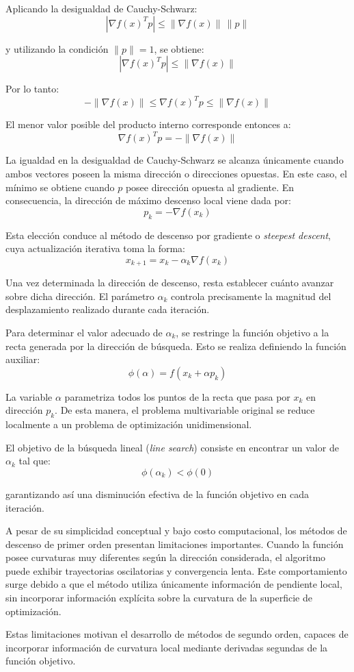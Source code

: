 Aplicando la desigualdad de Cauchy-Schwarz:
\[
|\nabla f(x)^Tp|
\leq
\|\nabla f(x)\|\,\|p\|
\]

y utilizando la condición \(\|p\|=1\), se obtiene:
\[
|\nabla f(x)^Tp|
\leq
\|\nabla f(x)\|
\]

Por lo tanto:
\[
-\|\nabla f(x)\|
\leq
\nabla f(x)^Tp
\leq
\|\nabla f(x)\|
\]

El menor valor posible del producto interno corresponde entonces a:
\[
\nabla f(x)^Tp=
-\|\nabla f(x)\|
\]

La igualdad en la desigualdad de Cauchy-Schwarz se alcanza únicamente cuando ambos vectores poseen la misma dirección o direcciones opuestas. En este caso, el mínimo se obtiene cuando \(p\) posee dirección opuesta al gradiente. En consecuencia, la dirección de máximo descenso local viene dada por:
\[
p_k=-\nabla f(x_k)
\]

Esta elección conduce al método de descenso por gradiente o \textit{steepest descent}, cuya actualización iterativa toma la forma:
\[
x_{k+1}=x_k-\alpha_k\nabla f(x_k)
\]

Una vez determinada la dirección de descenso, resta establecer cuánto avanzar sobre dicha dirección. El parámetro \(\alpha_k\) controla precisamente la magnitud del desplazamiento realizado durante cada iteración.

Para determinar el valor adecuado de \(\alpha_k\), se restringe la función objetivo a la recta generada por la dirección de búsqueda. Esto se realiza definiendo la función auxiliar:
\[
\phi(\alpha)=f(x_k+\alpha p_k)
\]

La variable \(\alpha\) parametriza todos los puntos de la recta que pasa por \(x_k\) en dirección \(p_k\). De esta manera, el problema multivariable original se reduce localmente a un problema de optimización unidimensional.

El objetivo de la búsqueda lineal (\textit{line search}) consiste en encontrar un valor de \(\alpha_k\) tal que:
\[
\phi(\alpha_k)<\phi(0)
\]

garantizando así una disminución efectiva de la función objetivo en cada iteración.

A pesar de su simplicidad conceptual y bajo costo computacional, los métodos de descenso de primer orden presentan limitaciones importantes. Cuando la función posee curvaturas muy diferentes según la dirección considerada, el algoritmo puede exhibir trayectorias oscilatorias y convergencia lenta. Este comportamiento surge debido a que el método utiliza únicamente información de pendiente local, sin incorporar información explícita sobre la curvatura de la superficie de optimización.

Estas limitaciones motivan el desarrollo de métodos de segundo orden, capaces de incorporar información de curvatura local mediante derivadas segundas de la función objetivo.